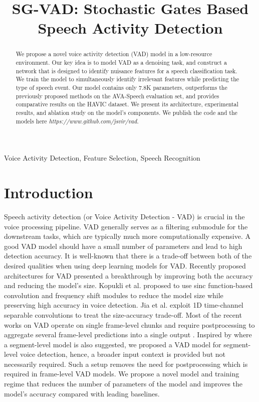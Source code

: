 \documentclass{article}
\title{SG-VAD: Stochastic Gates Based Speech Activity Detection}
\begin{document}
\maketitle

\begin{abstract}
We propose a novel voice activity detection (VAD) model in a low-resource environment. Our key idea is to model VAD as a denoising task, and construct a network that is designed to identify nuisance features for a speech classification task. We train the model to simultaneously identify irrelevant features while predicting the type of speech event. Our model contains only 7.8K parameters, outperforms the previously proposed methods on the AVA-Speech evaluation set, and provides comparative results on the HAVIC dataset. 
We present its architecture, experimental results, and ablation study on the model's components. We publish the code and the models here \textit{https://www.github.com/jsvir/vad}. 
\end{abstract}

\begin{keywords}
Voice Activity Detection, Feature Selection, Speech Recognition\end{keywords}
\section{Introduction}
\label{sec:intro}

Speech activity detection (or Voice Activity Detection - VAD) is crucial in the voice processing pipeline. VAD generally serves as a filtering submodule for the downstream tasks, which are typically much more computationally expensive. A good VAD model should have a small number of parameters and lead to high detection accuracy. It is well-known that there is a trade-off between both of the desired qualities when using deep learning models for VAD. Recently proposed architectures for VAD \cite{kopuklu2022resectnet, jia2021marblenet} presented a breakthrough by improving both the accuracy and reducing the model's size. Kopukli et al. \cite{kopuklu2022resectnet} proposed to use sinc function-based convolution and frequency shift modules to reduce the model size while preserving high accuracy in voice detection. Jia et al. \cite{jia2021marblenet} exploit 1D time-channel separable convolutions to treat the size-accuracy trade-off. Most of the recent works on VAD operate on single frame-level chunks and require postprocessing to aggregate several frame-level predictions into a single output \cite{kopuklu2022resectnet, jia2021marblenet, rho2022vad, braun2021training, xu2021lightweight, xiong2021computationally, kim2022ada, xu2020polishing, makishima2021enrollment}. Inspired by \cite{chen2020voice, lee2020dual, li2022voice} where a segment-level model is also suggested, we proposed a VAD model for segment-level voice detection, hence, a broader input context is provided but not necessarily required. Such a setup removes the need for postprocessing which is required in frame-level VAD models.
We propose a novel model and training regime that reduces the number of parameters of the model and improves the model's accuracy compared with leading baselines.
\end{document}
